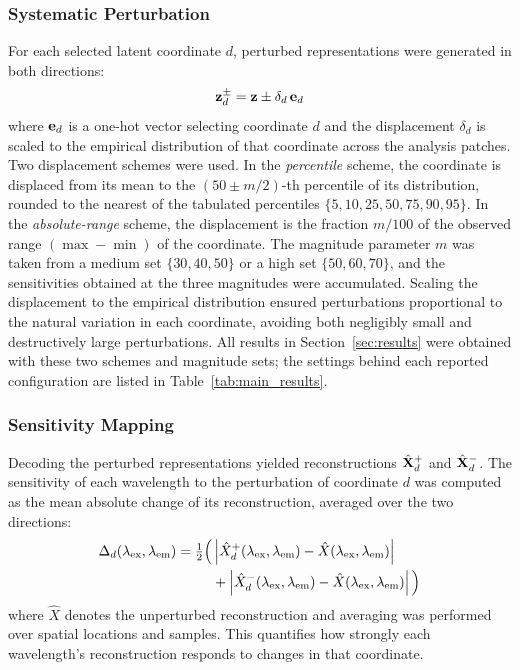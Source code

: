 \subsubsection{Systematic Perturbation}
For each selected latent coordinate $d$, perturbed representations were generated in both directions:
\begin{equation}
\mathbf{z}^{\pm}_d = \mathbf{z} \pm \delta_d \, \mathbf{e}_d
\label{eq:perturb}
\end{equation}
where $\mathbf{e}_d$ is a one-hot vector selecting coordinate $d$ and the displacement $\delta_d$ is scaled to the empirical distribution of that coordinate across the analysis patches.
Two displacement schemes were used.
In the \emph{percentile} scheme, the coordinate is displaced from its mean to the $(50 \pm m/2)$-th percentile of its distribution, rounded to the nearest of the tabulated percentiles $\{5, 10, 25, 50, 75, 90, 95\}$.
In the \emph{absolute-range} scheme, the displacement is the fraction $m/100$ of the observed range $(\max - \min)$ of the coordinate.
The magnitude parameter $m$ was taken from a medium set $\{30, 40, 50\}$ or a high set $\{50, 60, 70\}$, and the sensitivities obtained at the three magnitudes were accumulated.
Scaling the displacement to the empirical distribution ensured perturbations proportional to the natural variation in each coordinate, avoiding both negligibly small and destructively large perturbations.
All results in Section~\ref{sec:results} were obtained with these two schemes and magnitude sets; the settings behind each reported configuration are listed in Table~\ref{tab:main_results}.

\subsubsection{Sensitivity Mapping}
Decoding the perturbed representations yielded reconstructions $\hat{\mathbf{X}}^{+}_d$ and $\hat{\mathbf{X}}^{-}_d$.
The sensitivity of each wavelength to the perturbation of coordinate $d$ was computed as the mean absolute change of its reconstruction, averaged over the two directions:
\begin{equation}
\begin{split}
\Delta_d(\lambda_{\text{ex}}, \lambda_{\text{em}}) = \tfrac{1}{2}\Big( &\left| \hat{X}^{+}_d(\lambda_{\text{ex}}, \lambda_{\text{em}}) - \hat{X}(\lambda_{\text{ex}}, \lambda_{\text{em}}) \right| \\
&+ \left| \hat{X}^{-}_d(\lambda_{\text{ex}}, \lambda_{\text{em}}) - \hat{X}(\lambda_{\text{ex}}, \lambda_{\text{em}}) \right| \Big)
\end{split}
\label{eq:sensitivity}
\end{equation}
where $\hat{X}$ denotes the unperturbed reconstruction and averaging was performed over spatial locations and samples.
This quantifies how strongly each wavelength's reconstruction responds to changes in that coordinate.

